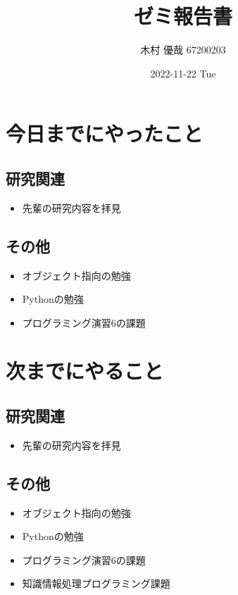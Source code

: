 \documentclass[uplatex, onecolumn, 10pt]{jsarticle}
\begin{document}
\title{\vspace{-40mm}\bf{\LARGE{ゼミ報告書}}}
\author{\vspace{-40mm}木村 優哉 67200203}
\date{2022-11-22 Tue}
\maketitle


\section{今日までにやったこと}

\subsection*{研究関連} 
\begin{itemize}
	\item 先輩の研究内容を拝見
\end{itemize}

\subsection*{その他}
\begin{itemize}
	\item オブジェクト指向の勉強
	\item Pythonの勉強
	\item プログラミング演習6の課題
\end{itemize}


\section{次までにやること}

\subsection*{研究関連} 
\begin{itemize}
	\item 先輩の研究内容を拝見
\end{itemize}

\subsection*{その他}
\begin{itemize}
	\item オブジェクト指向の勉強
	\item Pythonの勉強
	\item プログラミング演習6の課題
	\item 知識情報処理プログラミング課題
\end{itemize}
\end{document}
